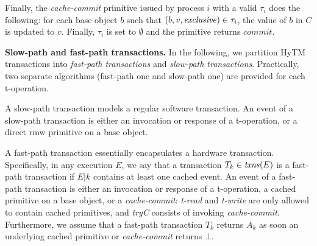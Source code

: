 Finally, the \emph{cache-commit} primitive issued by process $i$ with
a valid $\tau_i$ does the following: for each base object $b$ such that $(b,v,\mathit{exclusive}) \in \tau_i$, the value of $b$ in $C$ is updated to $v$. 
Finally, $\tau_i$ is set to $\emptyset$ and the primitive 
returns $\textit{commit}$. 

\vspace{1mm}\noindent\textbf{Slow-path and fast-path transactions.}
In the following, we partition HyTM transactions into \emph{fast-path
  transactions} and \emph{slow-path transactions}.
Practically,  two separate algorithms (fast-path one and slow-path one) 
are provided for each t-operation. 

A slow-path transaction models a regular software transaction.
An event of a slow-path transaction is either an invocation or response of a t-operation, or
a direct rmw primitive on a base object. 

A fast-path transaction essentially encapsulates a hardware transaction. Specifically, in any execution $E$,
we say that a transaction $T_k\in \ms{txns}(E)$ is a fast-path transaction if $E|k$ contains at least one cached event.
An event of a fast-path transaction is either an invocation or response of a t-operation, 
a cached primitive on a base object, or a \emph{cache-commit}:
\textit{t-read} and \emph{t-write} are only allowed to contain cached
primitives, and \textit{tryC} consists of invoking \emph{cache-commit}.  
Furthermore, we assume that a fast-path transaction $T_k$ returns $A_k$
as soon an underlying cached primitive or \emph{cache-commit} returns $\bot$. 
%
%